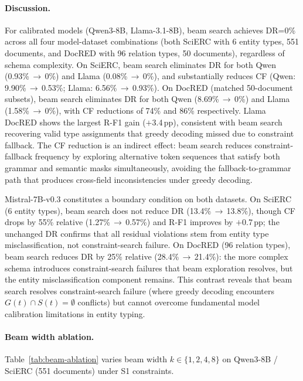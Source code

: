 \paragraph{Discussion.}
For calibrated models (Qwen3-8B, Llama-3.1-8B), beam search achieves DR=0\% across all four model-dataset combinations (both SciERC with 6 entity types, 551 documents, and DocRED with 96 relation types, 50 documents), regardless of schema complexity.
On SciERC, beam search eliminates DR for both Qwen (0.93\%\,$\to$\,0\%) and Llama (0.08\%\,$\to$\,0\%), and substantially reduces CF (Qwen: 9.90\%\,$\to$\,0.53\%; Llama: 6.56\%\,$\to$\,0.93\%).
On DocRED (matched 50-document subsets), beam search eliminates DR for both Qwen (8.69\%\,$\to$\,0\%) and Llama (1.58\%\,$\to$\,0\%), with CF reductions of 74\% and 86\% respectively.
Llama DocRED shows the largest R-F1 gain ($+$3.4\,pp), consistent with beam search recovering valid type assignments that greedy decoding missed due to constraint fallback.
The CF reduction is an indirect effect: beam search reduces constraint-fallback frequency by exploring alternative token sequences that satisfy both grammar and semantic masks simultaneously, avoiding the fallback-to-grammar path that produces cross-field inconsistencies under greedy decoding.

Mistral-7B-v0.3 constitutes a boundary condition on both datasets.
On SciERC (6 entity types), beam search does not reduce DR (13.4\%\,$\to$\,13.8\%), though CF drops by 55\% relative (1.27\%\,$\to$\,0.57\%) and R-F1 improves by $+$0.7\,pp; the unchanged DR confirms that all residual violations stem from entity type misclassification, not constraint-search failure.
On DocRED (96 relation types), beam search reduces DR by 25\% relative (28.4\%\,$\to$\,21.4\%): the more complex schema introduces constraint-search failures that beam exploration resolves, but the entity misclassification component remains.
This contrast reveals that beam search resolves constraint-search failure (where greedy decoding encounters $G(t) \cap S(t) = \emptyset$ conflicts) but cannot overcome fundamental model calibration limitations in entity typing.

\paragraph{Beam width ablation.}
Table~\ref{tab:beam-ablation} varies beam width $k \in \{1,2,4,8\}$ on Qwen3-8B / SciERC (551 documents) under S1 constraints.

